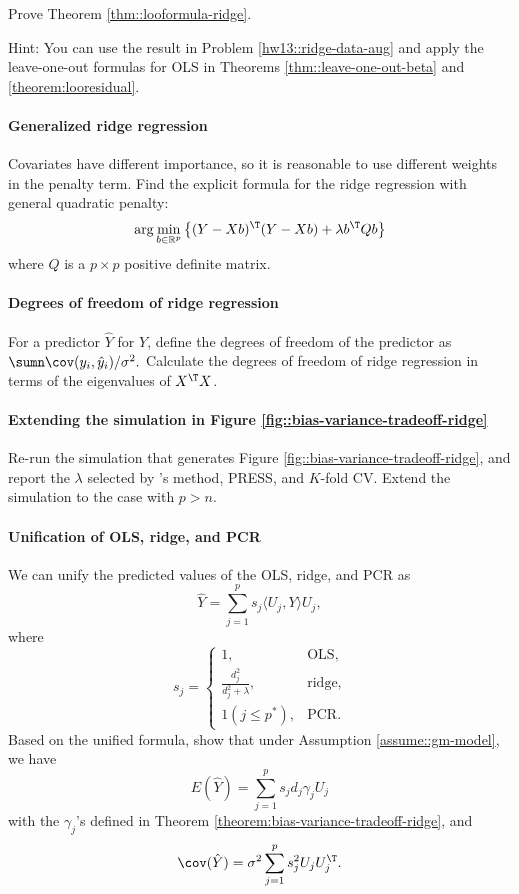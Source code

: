 Prove Theorem \ref{thm::looformula-ridge}. 


Hint: You can use the result in Problem \ref{hw13::ridge-data-aug} and apply the leave-one-out formulas for OLS in Theorems \ref{thm::leave-one-out-beta} and \ref{theorem:looresidual}. 




\paragraph{Generalized ridge regression}\label{hw13::general-ridge}

Covariates have different importance, so it is reasonable to use different weights in the
penalty term. Find the explicit formula for the ridge regression
with general quadratic penalty:
\[
\arg\min_{b\in\mathbb{R}^{p}}\left\{ (Y-Xb)^{\T}  (Y-Xb) +\lambda b^{\T}Qb\right\} 
\]
where $Q$ is a $p\times p$ positive definite matrix. 





\paragraph{Degrees of freedom of ridge regression}

For a predictor $\hat{Y}$ for $Y$, define the degrees of freedom
of the predictor as $\sumn\cov(y_{i},\hat{y}_{i}) /  \sigma^2 .$ Calculate the
degrees of freedom of ridge regression in terms of the eigenvalues
of $X^{\T}X$. 



\paragraph{Extending the simulation in Figure \ref{fig::bias-variance-tradeoff-ridge}}

Re-run the simulation that generates Figure \ref{fig::bias-variance-tradeoff-ridge}, and report the $\lambda$ selected by \citet{dempster1977simulation}'s method, PRESS, and $K$-fold CV. Extend the simulation to the case with $p>n.$




\paragraph{Unification of OLS, ridge, and PCR}\label{hw13::unification}


We can unify the predicted values of the OLS, ridge, and PCR as
$$
\hat{Y} = \sum_{j=1}^p  s_j  \langle U_j, Y \rangle U_j,
$$
where
$$
s_j  = 
\begin{cases}
1, & \text{OLS}, \\
\frac{  d_j^2 }{   d_j^2 + \lambda  },  & \text{ridge}, \\ 
1(j \leq p^*),  & \text{PCR} .
\end{cases}
$$
Based on the unified formula, show that under Assumption \ref{assume::gm-model}, we have 
$$
E (\hat{Y}  ) = \sum_{j=1}^p s_j d_j \gamma_j U_j
$$
with the $\gamma_j$'s defined in Theorem \ref{theorem:bias-variance-tradeoff-ridge}, and
$$
\cov (\hat{Y}  ) = \sigma^2  \sum_{j=1}^p  s_j^2 U_j U_j^{\T}. 
$$ 




